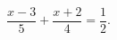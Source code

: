 \begin{ex}[type=equation]
	\begin{condition}
		$\dfrac{x- 3}{5}+\dfrac{x+2}{4} = \dfrac{1}{2}.$
	\end{condition}
\end{ex}